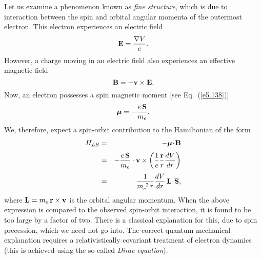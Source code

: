 Let us examine a phenomenon known as {\em fine structure}, which is due to
interaction between the spin and orbital angular momenta of the outermost 
electron. This electron experiences an electric field
\begin{equation}
{\bf E} = \frac{\nabla V}{e}.
\end{equation}
However, a charge moving in an electric field also experiences an effective
magnetic field
\begin{equation}
{\bf B} = - {\bf v} \times {\bf E}.
\end{equation}
Now, an electron possesses a spin magnetic moment [see Eq.~(\ref{e5.138})]
\begin{equation}
{\mbox{\boldmath$\mu$}} = - \frac{e\, {\bf S}}{m_e}.
\end{equation}
We, therefore, expect a spin-orbit contribution to the Hamiltonian of
the form
\begin{eqnarray}
H_{LS} &= &- {\mbox{\boldmath$\mu$}}\!\cdot\! {\bf B} \nonumber\\[0.5ex]
&=& - \frac{e \,{\bf S}}{m_e} \cdot {\bf v} \times \left(\frac{1}{e} \frac{\bf r}{r}
\frac{d V}{dr}\right)\nonumber\\[0.5ex]
&=& \frac{1}{m_e^{~2}\,r}  \frac{d V}{dr}\, {\bf L}\!\cdot \!{\bf S},\label{e6.101}
\end{eqnarray}
where ${\bf  L} = m_e \,{\bf  r}\times{\bf v}$ is the orbital angular momentum.
When the above expression is compared to the observed spin-orbit interaction,
it is found to be too large by a factor of two. There is a classical explanation
for this, due to spin precession, which we need not go into. The correct 
quantum mechanical explanation requires a relativistically covariant
treatment of electron dynamics (this is achieved  using the so-called {\em
Dirac equation}). 

